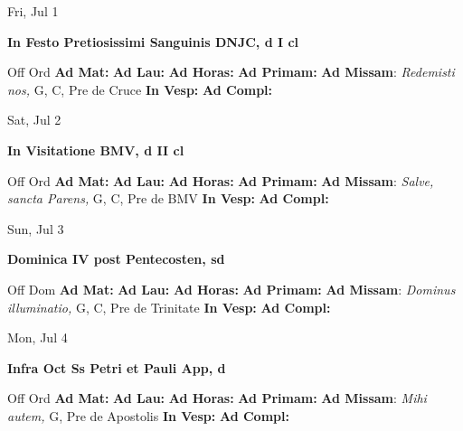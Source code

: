 \documentclass[10pt]{article}
\begin{document}
\begin{minipage}{3.5in}
\vspace{2em}\begin{center}
Fri, Jul 1
\end{center}\textbf{ \large In Festo Pretiosissimi Sanguinis DNJC, \textnormal{\normalsize d I cl}}
\begin{justify}
Off Ord
\textbf{Ad Mat: }
\textbf{Ad Lau: }
\textbf{Ad Horas: }
\textbf{Ad Primam: }
\textbf{Ad Missam}: \textit{Redemisti nos,} G, C, Pre de Cruce
\textbf{In Vesp: }
\textbf{Ad Compl: }\end{justify}
\end{minipage}



\begin{minipage}{3.5in}
\vspace{2em}\begin{center}
Sat, Jul 2
\end{center}\textbf{ \large In Visitatione BMV, \textnormal{\normalsize d II cl}}
\begin{justify}
Off Ord
\textbf{Ad Mat: }
\textbf{Ad Lau: }
\textbf{Ad Horas: }
\textbf{Ad Primam: }
\textbf{Ad Missam}: \textit{Salve, sancta Parens,} G, C, Pre de BMV
\textbf{In Vesp: }
\textbf{Ad Compl: }\end{justify}
\end{minipage}



\begin{minipage}{3.5in}
\vspace{2em}\begin{center}
Sun, Jul 3
\end{center}\textbf{ \large Dominica IV post Pentecosten, \textnormal{\normalsize sd}}
\begin{justify}
Off Dom
\textbf{Ad Mat: }
\textbf{Ad Lau: }
\textbf{Ad Horas: }
\textbf{Ad Primam: }
\textbf{Ad Missam}: \textit{Dominus illuminatio,} G, C, Pre de Trinitate
\textbf{In Vesp: }
\textbf{Ad Compl: }\end{justify}
\end{minipage}



\begin{minipage}{3.5in}
\vspace{2em}\begin{center}
Mon, Jul 4
\end{center}\textbf{ \large Infra Oct Ss Petri et Pauli App, \textnormal{\normalsize d}}
\begin{justify}
Off Ord
\textbf{Ad Mat: }
\textbf{Ad Lau: }
\textbf{Ad Horas: }
\textbf{Ad Primam: }
\textbf{Ad Missam}: \textit{Mihi autem,} G, Pre de Apostolis
\textbf{In Vesp: }
\textbf{Ad Compl: }\end{justify}
\end{minipage}
\end{document}
